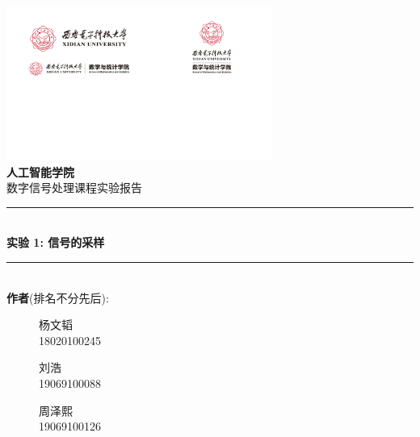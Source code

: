 \documentclass[cs4size,a4paper]{ctexart}
\newcommand{\HRule}{\rule{\linewidth}{0.5mm}}
\begin{document}
	
	\begin{titlepage}
		
		\begin{center}
			
			
			\includegraphics[width=0.65\textwidth]{figure/logo_xdred}\\[1cm]    
			
			\textsc{\LARGE \bfseries 人工智能学院}\\[1.5cm]
			
			\textsc{\Large 数字信号处理课程实验报告}\\[0.5cm]
			
			\HRule \\[0.4cm]
			{ \huge \bfseries 实验 1: 信号的采样}\\[0.4cm]
			
			\HRule \\[1.5cm]
			
			\large \textbf{作者}(排名不分先后): \\[0.5cm]
			\begin{figure}[htbp]
			\centering
			\begin{minipage}[t]{0.3\textwidth}
				\begin{center} \large
					\textsc {\kaishu 杨文韬\\18020100245}
			\end{center}
			\end{minipage}
			\hfill
			\begin{minipage}[t]{0.3\textwidth}
				\begin{center} \large
					\textsc {\kaishu 刘浩\\19069100088}
				\end{center}
			\end{minipage}
			\hfill
			\begin{minipage}[t]{0.3\textwidth}
				\begin{center} \large
					\textsc {\kaishu 周泽熙\\19069100126}
				\end{center}
			\end{minipage}
			\end{figure}
			

\end{center}
\end{titlepage}
\end{document}
